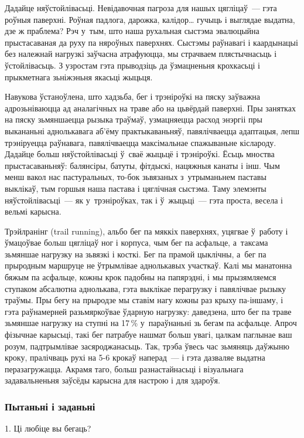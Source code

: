 Дадайце няўстойлівасьці. Невідавочная пагроза для нашых цягліцаў~--- гэта роўныя паверхні. Роўная падлога, дарожка, калідор… гучыць і выглядае выдатна, дзе ж праблема? Рэч у~тым, што наша рухальная сыстэма эвалюцыйна прыстасаваная да руху па няроўных паверхнях. Сыстэмы раўнавагі і каардынацыі без належнай нагрузкі заўчасна атрафуюцца, мы страчваем плястычнасьць і ўстойлівасьць. З узростам гэта прыводзіць да ўзмацненьня крохкасьці і прыкметнага зьніжэньня якасьці жыцьця.

Навукова ўстаноўлена, што хадзьба, бег і трэніроўкі на пяску заўважна адрозьніваюцца ад аналагічных на траве або на цьвёрдай паверхні. Пры занятках на пяску зьмяншаецца рызыка траўмаў, узмацняецца расход энэргіі пры выкананьні аднолькавага аб'ёму практыкаваньняў, павялічваецца адаптацыя, лепш трэніруецца раўнавага, павялічваецца максімальнае спажываньне кіслароду. Дадайце больш няўстойлівасьці ў~сваё жыцьцё і трэніроўкі. Ёсьць мноства прыстасаваньняў: балянсіры, батуты, фітдыскі, нацяжныя канаты і інш. Чым менш вакол нас пастуральных, то-бок зьвязаных з~утрыманьнем паставы выклікаў, тым горшыя наша пастава і цяглічная сыстэма. Таму элемэнты няўстойлівасьці~--- як у~трэніроўках, так і ў~жыцьці~--- гэта проста, весела і вельмі карысна.

Трэйлранінг (trail running), альбо бег па мяккіх паверхнях, уцягвае ў~работу і ўмацоўвае больш цягліцаў ног і корпуса, чым бег па асфальце, а~таксама зьмяншае нагрузку на зьвязкі і косткі. Бег па прамой цыклічны, а~бег па прыродным маршруце не ўтрымлівае аднолькавых участкаў. Калі мы манатонна бяжым па асфальце, кожны крок падобны на папярэдні, і мы прызямляемся ступаком абсалютна аднолькава, гэта выклікае перагрузку і павялічвае рызыку траўмы. Пры бегу на прыродзе мы ставім нагу кожны раз крыху па-іншаму, і гэта раўнамерней разьмяркоўвае ўдарную нагрузку: даведзена, што бег па траве зьмяншае нагрузку на ступні на 17\,\% у~параўнаньні зь бегам па асфальце. Апроч фізычнае карысьці, такі бег патрабуе нашмат больш увагі, цалкам паглынае ваш розум, падтрымлівае засяроджанасьць. Так, трэба ўвесь час зьмяняць даўжыню кроку, пралічваць рухі на 5-6 крокаў наперад~--- і гэта дазваляе выдатна перазагружацца. Акрамя таго, больш разнастайнасьці і візуальнага задавальненьня заўсёды карысна для настрою і для здароўя.

\subsubsection{Пытаньні і заданьні}

1. Ці любіце вы бегаць?

